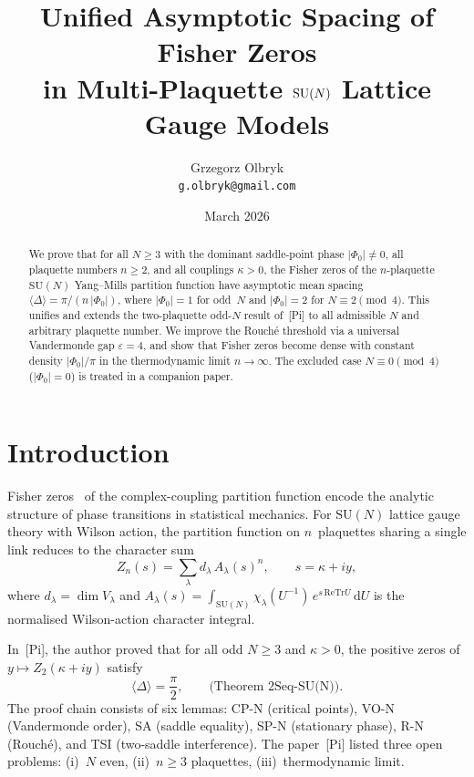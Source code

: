\documentclass[12pt]{article}
\title{Unified Asymptotic Spacing of Fisher Zeros\\
in Multi-Plaquette $\SU(N)$ Lattice Gauge Models}
\author{Grzegorz Olbryk\\[-2pt]
\small\texttt{g.olbryk@gmail.com}}
\date{March 2026}
\theoremstyle{remark}
\newcommand{\SU}{\mathrm{SU}}
\newcommand{\Tr}{\mathrm{Tr}}
\newcommand{\dU}{\,\mathrm{d}U}
\newcommand{\avg}[1]{\langle #1 \rangle}
\begin{document}
\maketitle

\begin{abstract}
We prove that for all $N \geq 3$ with the dominant saddle-point phase
$|\Phi_0| \neq 0$, all plaquette numbers $n \geq 2$, and all couplings
$\kappa > 0$, the Fisher zeros of the $n$-plaquette $\SU(N)$ Yang--Mills
partition function have asymptotic mean spacing
$\avg{\Delta} = \pi/(n\,|\Phi_0|)$,
where $|\Phi_0| = 1$ for odd~$N$ and $|\Phi_0| = 2$ for
$N \equiv 2\!\pmod{4}$. This unifies and extends the two-plaquette
odd-$N$ result of~[Pi] to all admissible $N$ and arbitrary plaquette
number. We improve the Rouch\'e threshold via a universal Vandermonde gap
$\varepsilon = 4$, and show that Fisher zeros become dense with constant
density $|\Phi_0|/\pi$ in the thermodynamic limit $n \to \infty$.
The excluded case $N \equiv 0\!\pmod{4}$ ($|\Phi_0| = 0$) is treated
in a companion paper.
\end{abstract}


\section{Introduction}

Fisher zeros~\cite{Fisher1965} of the complex-coupling partition function
encode the analytic structure of phase transitions in statistical mechanics.
For $\SU(N)$ lattice gauge theory with Wilson action, the partition function
on $n$~plaquettes sharing a single link reduces to the character sum
\begin{equation}\label{eq:Zn}
  Z_n(s) = \sum_\lambda d_\lambda\, A_\lambda(s)^n, \qquad
  s = \kappa + iy,
\end{equation}
where $d_\lambda = \dim V_\lambda$ and
$A_\lambda(s) = \int_{\SU(N)} \chi_\lambda(U^{-1})\, e^{s\,\mathrm{Re}\Tr U}\dU$
is the normalised Wilson-action character integral.

In~[Pi], the author proved that for all odd $N \geq 3$ and $\kappa > 0$,
the positive zeros of $y \mapsto Z_2(\kappa + iy)$ satisfy
\begin{equation}\label{eq:pi-result}
  \avg{\Delta} = \frac{\pi}{2}, \qquad \text{(Theorem~2Seq-SU(N))}.
\end{equation}
The proof chain consists of six lemmas: CP-N (critical points),
VO-N (Vandermonde order), SA (saddle equality), SP-N (stationary phase),
R-N (Rouch\'e), and TSI (two-saddle interference). The paper~[Pi] listed
three open problems: (i)~$N$ even, (ii)~$n \geq 3$ plaquettes,
(iii)~thermodynamic limit.
\end{document}
